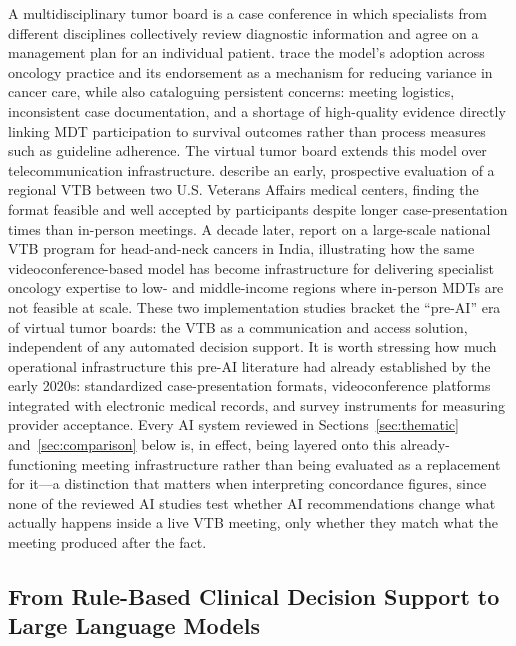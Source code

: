 \documentclass{article}
\begin{document}
A multidisciplinary tumor board is a case conference in which specialists from different disciplines collectively review diagnostic information and agree on a management plan for an individual patient. \citet{patkar2011} trace the model's adoption across oncology practice and its endorsement as a mechanism for reducing variance in cancer care, while also cataloguing persistent concerns: meeting logistics, inconsistent case documentation, and a shortage of high-quality evidence directly linking MDT participation to survival outcomes rather than process measures such as guideline adherence. The virtual tumor board extends this model over telecommunication infrastructure. \citet{marshall2014} describe an early, prospective evaluation of a regional VTB between two U.S. Veterans Affairs medical centers, finding the format feasible and well accepted by participants despite longer case-presentation times than in-person meetings. A decade later, \citet{thiagarajan2023} report on a large-scale national VTB program for head-and-neck cancers in India, illustrating how the same videoconference-based model has become infrastructure for delivering specialist oncology expertise to low- and middle-income regions where in-person MDTs are not feasible at scale. These two implementation studies bracket the ``pre-AI'' era of virtual tumor boards: the VTB as a communication and access solution, independent of any automated decision support. It is worth stressing how much operational infrastructure this pre-AI literature had already established by the early 2020s: standardized case-presentation formats, videoconference platforms integrated with electronic medical records, and survey instruments for measuring provider acceptance. Every AI system reviewed in Sections~\ref{sec:thematic} and~\ref{sec:comparison} below is, in effect, being layered onto this already-functioning meeting infrastructure rather than being evaluated as a replacement for it---a distinction that matters when interpreting concordance figures, since none of the reviewed AI studies test whether AI recommendations change what actually happens inside a live VTB meeting, only whether they match what the meeting produced after the fact.

\subsection{From Rule-Based Clinical Decision Support to Large Language Models}
\label{sec:rule-to-llm}
\end{document}
